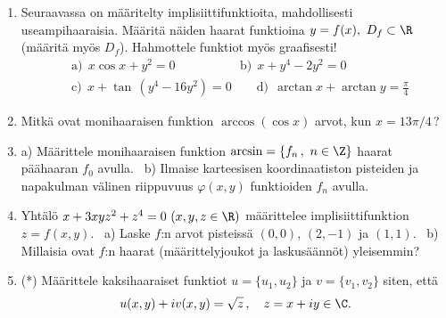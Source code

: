 \Harj
\begin{enumerate}

\item
Seuraavassa on määritelty implisiittifunktioita, mahdollisesti useampihaaraisia. Määritä näiden
haarat funktioina $y=f(x),\ D_f\subset\R$ (määritä myös $D_f$). Hahmottele funktiot myös 
graafisesti!
\begin{align*}
&\text{a)}\ \ x\cos x+y^2=0 \qquad\qquad\quad\,
 \text{b)}\ \ x+y^4-2y^2=0 \\
&\text{c)}\ \ x+\tan\,(y^4-16y^2)=0 \qquad
 \text{d)}\ \ \arctan x + \arctan y=\frac{\pi}{4}
\end{align*}

\item
Mitkä ovat monihaaraisen funktion $\arccos(\cos x)$ arvot, kun $x=13\pi/4$\,?

\item
a) Määrittele monihaaraisen funktion $\arcsin=\{f_n\,,\ n\in\Z\}$ haarat päähaaran $f_0$
avulla. \ b) Ilmaise karteesisen koordinaatiston pisteiden ja napakulman välinen riippuvuus
$\varphi(x,y)$ funktioiden $f_n$ avulla.

\item
Yhtälö $x+3xyz^2+z^4=0\ (x,y,z\in\R)$ määrittelee implisiittifunktion $z=f(x,y)$. \ a) Laske 
$f$:n arvot pisteissä $(0,0)$, $(2,-1)$ ja $(1,1)$. \ b)  Millaisia ovat $f$:n haarat 
(määrittelyjoukot ja laskusäännöt) yleisemmin?

\item (*)
Määrittele kaksihaaraiset funktiot $u=\{u_1,u_2\}$ ja $v=\{v_1,v_2\}$ siten, että
\[
u(x,y)+iv(x,y)=\sqrt{z}\,, \quad z=x+iy\in\C.
\]

\end{enumerate}
